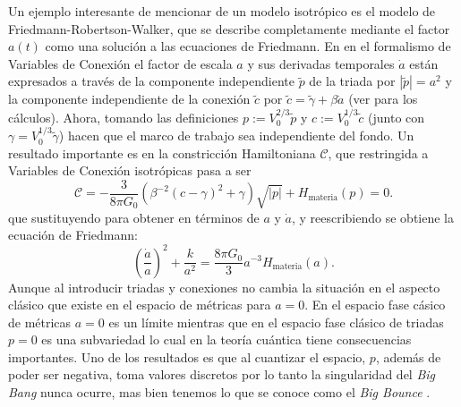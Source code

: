 Un ejemplo interesante de mencionar de un modelo isotr\'{o}pico es el modelo de Friedmann-Robertson-Walker, que se describe completamente mediante el factor $a(t)$ como una soluci\'{o}n a las ecuaciones de Friedmann. En en el formalismo de Variables de Conexi\'{o}n el factor de escala $a$ y sus derivadas temporales $\dot{a}$ est\'{a}n expresados a trav\'{e}s de la componente independiente $\tilde{p}$ de la triada por $|\tilde{p}| = a^{2}$ y la componente independiente de la conexi\'{o}n $\tilde{c}$ por $\tilde{c} = \tilde{\gamma} + \beta \dot{a}$ (ver \cite{Bojowald2000} para los c\'{a}lculos). Ahora, tomando las definiciones $p := V_{0}^{2/3} \tilde{p}$ y $c := V_{0}^{1/3} \tilde{c}$ (junto con $\gamma = V^{1/3}_{0} \tilde{\gamma}$) hacen que el marco de trabajo sea independiente del fondo. Un resultado importante es en la constricci\'{o}n Hamiltoniana $\mathcal{C}$, que restringida a Variables de Conexi\'{o}n isotr\'{o}picas pasa a ser \cite{Bojowald2002, Bojowald2005}
%
\begin{equation}
\mathcal{C} = -\frac{3}{8 \pi G_{0}} \left( \beta^{-2} (c - \gamma)^{2} + \gamma \right) \sqrt{|p|} + H_{\mathrm{materia}} (p) = 0.
\end{equation}
%
que sustituyendo para obtener en t\'{e}rminos de $a$ y $\dot{a}$, y reescribiendo se obtiene la ecuaci\'{o}n de Friedmann:
%
\begin{equation}
\left( \frac{\dot{a}}{a} \right)^{2} + \frac{k}{a^{2}} = \frac{8 \pi G_{0}}{3} a^{-3} H_{\mathrm{materia}}(a).
\end{equation}
%
Aunque al introducir triadas y conexiones no cambia la situaci\'{o}n en el aspecto cl\'{a}sico que existe en el espacio de m\'{e}tricas para $a = 0$. En el espacio fase c\'{a}sico de m\'{e}tricas $a = 0$ es un l\'{i}mite mientras que en el espacio fase cl\'{asico} de triadas $p = 0$ es una subvariedad lo cual en la teor\'{i}a cu\'{a}ntica tiene consecuencias importantes. {\color{red} Uno de los resultados es que al cuantizar el espacio, $p$, adem\'{a}s de poder ser negativa, toma valores discretos por lo tanto la singularidad del \emph{Big Bang} nunca ocurre, mas bien tenemos lo que se conoce como el \emph{Big Bounce} \cite{BB}.}